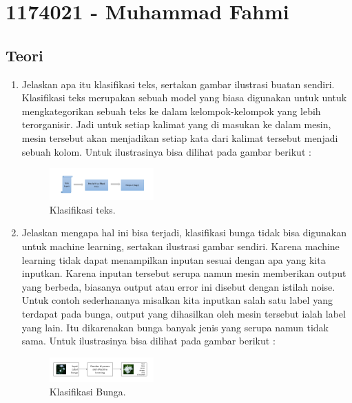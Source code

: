 \section{1174021 - Muhammad Fahmi}
\subsection{Teori}
\begin{enumerate}

	\item Jelaskan apa itu klasifikasi teks, sertakan gambar ilustrasi buatan sendiri.
	\hfill\break
	Klasifikasi teks merupakan sebuah model yang biasa digunakan untuk untuk mengkategorikan sebuah teks ke dalam kelompok-kelompok yang lebih terorganisir. Jadi untuk setiap kalimat yang di masukan ke dalam mesin, mesin tersebut akan menjadikan setiap kata dari kalimat tersebut menjadi sebuah kolom. Untuk ilustrasinya bisa dilihat pada gambar berikut : 

	\begin{figure}[H]
	\centering
		\includegraphics[width=4cm]{figures/1174021/tugas4/materi/1.PNG}
		\caption{Klasifikasi teks.}
	\end{figure}

	\item Jelaskan mengapa hal ini bisa terjadi, klasifikasi bunga tidak bisa digunakan untuk machine learning, sertakan ilustrasi gambar sendiri.
	\hfill\break
	Karena machine learning tidak dapat menampilkan inputan sesuai dengan apa yang kita inputkan. Karena inputan tersebut serupa namun mesin memberikan output yang berbeda, biasanya output atau error ini disebut dengan istilah noise. Untuk contoh sederhananya misalkan kita inputkan salah satu label yang terdapat pada bunga, output yang dihasilkan oleh mesin tersebut ialah label yang lain. Itu dikarenakan bunga banyak jenis yang serupa namun tidak sama. Untuk ilustrasinya bisa dilihat pada gambar berikut : 

	\begin{figure}[H]
	\centering
		\includegraphics[width=4cm]{figures/1174021/tugas4/materi/2.PNG}
		\caption{Klasifikasi Bunga.}
	\end{figure}
	

\end{enumerate}
